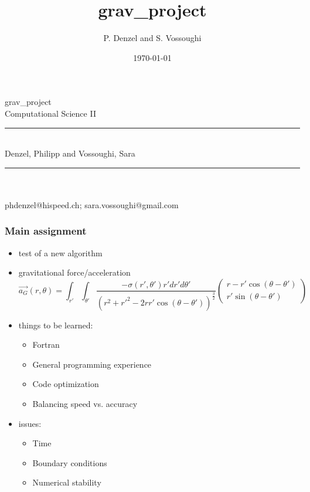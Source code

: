 \documentclass{beamer}
\title{grav\_project}
\author{P. Denzel and S. Vossoughi}
\date{\today}
\begin{document}
\begin{frame}
 \LARGE
 \sf 	   grav\_project \\ 
	   Computational Science II \\

\rule{0.8\textwidth}{0.5pt} \\ %
 \Large Denzel, Philipp and Vossoughi, Sara \\
\rule{0.8\textwidth}{0.5pt} \\  %
   \\ phdenzel@hispeed.ch; sara.vossoughi@gmail.com \\
\end{frame}
\begin{frame}
 \frametitle{Main assignment}
 \begin{itemize}
  \item test of a new algorithm
  \item gravitational force/acceleration
  \begin{equation*}
   \overrightarrow{a_{G}}(r,\theta) = \int_{r'}\int_{\theta'} \frac{-\sigma(r',\theta')r'dr'd\theta'}{(r^{2}+r'^{2}-2rr'\cos{(\theta-\theta')})^{\frac{3}{2}}} \left(
    \begin{array}{c}
      r-r'\cos{(\theta-\theta')} \\
      r'\sin{(\theta-\theta')}
    \end{array}
  \right)
  \end{equation*}
  \item things to be learned:
  \begin{itemize}
   \item Fortran
   \item General programming experience
   \item Code optimization
   \item Balancing speed vs. accuracy
  \end{itemize}
  \item issues:
  \begin{itemize}
   \item Time
   \item Boundary conditions
   \item Numerical stability
  \end{itemize}
 \end{itemize}
\end{frame}
\end{document}
